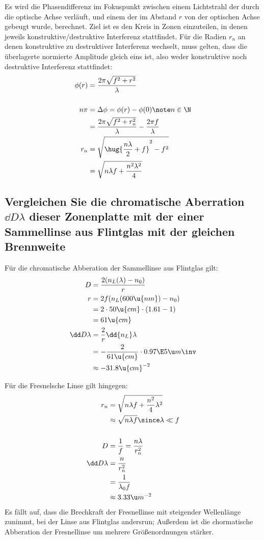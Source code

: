 \documentclass[ex]{exercise}
\begin{document}
\dottedlinett

Es wird die Phasendifferenz im Fokuspunkt zwischen einem Lichtstrahl
der durch die optische Achse verläuft, und einem der im Abstand \(r\) von der 
optischen Achse gebeugt wurde, berechnet. Ziel ist es den Kreis in Zonen einzuteilen, in
denen jeweils konstruktive/destruktive Interferenz stattfindet. Für die 
Radien \(r_n\) an denen konstruktive zu destruktiver Interferenz wechselt, muss gelten, dass 
die überlagerte normierte Amplitude gleich eins ist, also weder konstruktive noch destruktive
Interferenz stattfindet:
\begin{align*}
    \phi(r) &= \frac{2\pi \sqrt{f^2 + r^2}}{\lambda}\\
    \\
    n\pi &= \Delta \phi = \phi(r)-\phi(0)\note n\in\N\\
    &= \frac{2\pi \sqrt{f^2 + r_n^2}}{\lambda} - \frac{2\pi f }{\lambda}\\
    r_n &= \sqrt{\hug{\frac{n\lambda}2 + f}^2 - f^2}\\
    &= \sqrt{n\lambda f + \frac{n^2\lambda^2}4}
\end{align*}

\subsection{Vergleichen Sie die chromatische Aberration \(\dd D\lambda\)
dieser Zonenplatte mit der einer Sammellinse aus Flintglas mit
der gleichen Brennweite}

\dottedlinett

Für die chromatische Abberation der Sammellinse aus Flintglas gilt:
\begin{align*}
    D &= \frac{2(n_L(\lambda) - n_0)}{r}\\
    r &= 2f (n_L(600\u{nm}) - n_0)\\
    &= 2\cdot 50\u{cm} \cdot (1.61 - 1)\\
    &= 61 \u{cm}\\
    \dd D\lambda &= \frac{2}{r} \dd{n_L}\lambda\\
    &= - \frac{2}{61 \u{cm}} \cdot 0.97\E5 \u m\inv\\
    &\approx - 31.8 \u{cm}^{-2}\\
\end{align*}

Für die Fresnelsche Linse gilt hingegen:
\begin{align*}
    r_n &= \sqrt{n \lambda f + \frac{n^2}{4}\lambda^2}\\
    &\approx \sqrt{n \lambda f} \since \lambda\ll f\\
    \\
    D &=\frac1f =  \frac{n\lambda}{r_n^2}\\
    \dd D\lambda &= \frac{n}{r_n^2}\\
    &= \frac1{\lambda_0 f}\\
    &\approx 3.33 \u m^{-2}
\end{align*}
Es fällt auf, dass die Brechkraft der Fresnellinse mit steigender Wellenlänge
zunimmt, bei der Linse aus Flintglas andersrun; Au{\ss}erdem ist die 
chormatische Abberation der  
Fresnellinse um mehrere Grö{\ss}enordnungen stärker.
\end{document}
